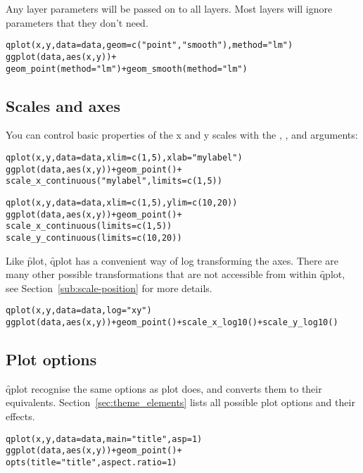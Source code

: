 Any layer parameters will be passed on to all layers.  Most layers will ignore parameters that they don't need.

\begin{alltt}
qplot(x, y, data = data, geom = c("point", "smooth"), method = "lm")
ggplot(data, aes(x, y)) + 
  geom_point(method = "lm") + geom_smooth(method = "lm")
\end{alltt}

\subsection{Scales and axes}

You can control basic properties of the x and y scales with the , ,  and  arguments:

\begin{alltt}
qplot(x, y, data = data, xlim = c(1, 5), xlab = "my label")
ggplot(data, aes(x, y)) + geom_point() + 
  scale_x_continuous("my label", limits = c(1, 5))

qplot(x, y, data = data, xlim = c(1, 5), ylim = c(10, 20))
ggplot(data, aes(x, y)) + geom_point() + 
  scale_x_continuous(limits = c(1, 5))
  scale_y_continuous(limits = c(10, 20))
\end{alltt}

Like \f{plot}, \f{qplot} has a convenient way of log transforming the axes.  There are many other possible transformations that are not accessible from within \f{qplot}, see Section~\ref{sub:scale-position} for more details.

\begin{alltt}
qplot(x, y, data = data, log="xy")
ggplot(data, aes(x, y)) + geom_point() + scale_x_log10() + scale_y_log10()
\end{alltt}

\subsection{Plot options}

\f{qplot} recognise the same options as plot does, and converts them to their \ggplot equivalents.  Section~\ref{sec:theme_elements} lists all possible plot options and their effects.

\begin{alltt}
qplot(x, y, data = data, main="title", asp = 1)
ggplot(data, aes(x, y)) + geom_point() + 
  opts(title = "title", aspect.ratio = 1)
\end{alltt}

